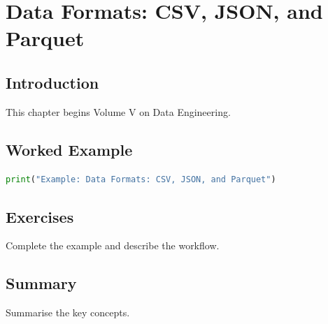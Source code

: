 \chapter{Data Formats: CSV, JSON, and Parquet}
\label{chap:vol5-2}



\section{Introduction}
This chapter begins Volume V on Data Engineering.

\section{Worked Example}
\begin{lstlisting}[language=Python]
print("Example: Data Formats: CSV, JSON, and Parquet")
\end{lstlisting}

\section{Exercises}
\begin{exercise}
Complete the example and describe the workflow.
\end{exercise}

\section{Summary}
Summarise the key concepts.
